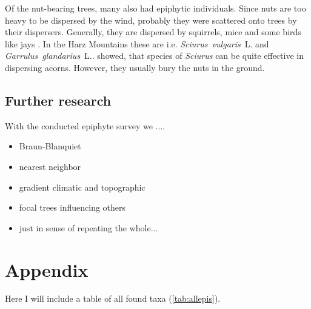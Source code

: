 \documentclass[12pt, a4paper, oneside, draft]{scrartcl}
\begin{document}
Of the nut-bearing trees, many also had epiphytic individuals. Since nuts are too heavy to be dispersed by the wind, probably they were scattered onto trees by their dispersers. Generally, they are dispersed by squirrels, mice and some birds like jays \parencite{VanderWall2001}. In the Harz Mountains these are i.e. \textit{Sciurus~vulgaris}~L. and  \textit{Garrulus~glandarius}~L.. \textcite{Gomez2008} showed, that species of \textit{Sciurus} can be quite effective in dispersing acorns. However, they usually bury the nuts in the ground.

	\subsection{Further research}
	With the conducted epiphyte survey we ....
		\begin{itemize}
		\item Braun-Blanquiet
		\item nearest neighbor
		\item gradient climatic and topographic
		\item focal trees influencing others
		\item just in sense of repeating the whole...
		\end{itemize}

\newpage
\begin{multicols}{2}[\printbibheading]
	\sloppy
	\printbibliography[heading=none]
\end{multicols}
\newpage
\section*{Appendix}
	\setcounter{table}{0}
	\renewcommand{\thetable}{A-\arabic{table}}
	Here I will include a table of all found taxa (\autoref{tab:allepis}).\\	
	
%	
	
%	

\listoftodos

\end{document}
